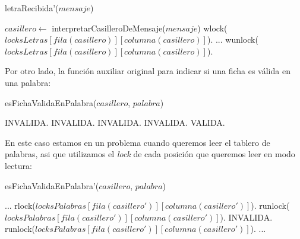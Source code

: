 \begin{algorithm}[H]
\caption{letraRecibida'($mensaje$)}
\begin{algorithmic}[1]
    \STATE $casillero \leftarrow$ interpretarCasilleroDeMensaje($mensaje$)
    \STATE wlock($locksLetras[fila(casillero)][columna(casillero)]$).
    \STATE ...
    \STATE wunlock($locksLetras[fila(casillero)][columna(casillero)]$).
\end{algorithmic}
\end{algorithm}

Por otro lado, la función auxiliar original para indicar si una ficha es válida en una palabra:

\begin{algorithm}[H]
\caption{esFichaValidaEnPalabra($casillero$, $palabra$)}
\begin{algorithmic}[1]
        \RETURN INVALIDA.
    \ENDIF
        \RETURN INVALIDA.
    \ENDIF
                    \RETURN INVALIDA.
                \ENDIF
            \ENDFOR
        \ELSE
            \RETURN INVALIDA.
        \ENDIF
    \ENDIF
    \RETURN VALIDA.
\end{algorithmic}
\end{algorithm}

\noindent En este caso estamos en un problema cuando queremos leer el tablero de palabras, asi que utilizamos el \emph{lock} de cada posición que queremos leer en modo lectura:

\begin{algorithm}[H]
\caption{esFichaValidaEnPalabra'($casillero$, $palabra$)}
\begin{algorithmic}[1]
    \STATE ...
        \STATE rlock($locksPalabras[fila(casillero')][columna(casillero')]$).
            \STATE runlock($locksPalabras[fila(casillero')][columna(casillero')]$).
            \RETURN INVALIDA.
        \ENDIF
        \STATE runlock($locksPalabras[fila(casillero')][columna(casillero')]$).
    \ENDFOR
    \STATE ...
\end{algorithmic}
\end{algorithm}

